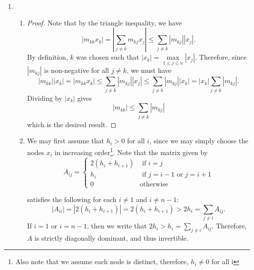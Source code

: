 \documentclass[12pt]{article}
\begin{document}
\begin{enumerate}[leftmargin=2em]
    \item
    \begin{enumerate}
        \item
        \begin{proof}
            Note that by the triangle inequality, we have
            \[|m_{kk}x_k|=\left| \sum_{j\neq k} m_{kj}x_{j}\right|\leq \sum_{j\neq k} |m_{kj}||x_j|.\]
            By definition, $k$ was chosen such that $|x_{k}|= \max\limits_{1\leq j\leq n} |x_j|$. Therefore, since $|m_{kj}|$ is non-negative for all $j\neq k$, we must have
            \[|m_{kk}||x_k|=|m_{kk}x_k|\leq \sum_{j\neq k} |m_{kj}||x_j| \leq \sum_{j\neq k} |m_{kj}||x_k|=|x_k|\sum_{j\neq k} |m_{kj}|.\]
            Dividing by $|x_k|$ gives
            \[|m_{kk}|\leq \sum_{j\neq k} |m_{kj}|\]
            which is the desired result.
        \end{proof}
        \item
        We may first assume that $h_i>0$ for all $i$, since we may simply choose the nodes $x_i$ in increasing order\footnote{Also note that we assume each node is distinct, therefore, $h_{i}\neq 0$ for all i}.
        Note that the matrix given by
        \[A_{ij}=\begin{cases}
            2(h_i+h_{i+1}) & \text{ if } i=j\\
            h_i & \text{ if } j = i-1 \text{ or } j= i+1\\
            0 & \text{otherwise}
        \end{cases}\]

        satisfies the following for each $i\neq 1$ and $i\neq n-1$:
        \[|A_{ii}|=|2(h_{i}+h_{i+1})|=2(h_{i}+h_{i+1})>2h_{i}=\sum_{j\neq i} A_{ij}.\]
        If $i=1$ or $i=n-1$, then we write that $2h_{i}>h_{i}=\sum_{j\neq i} A_{ij}$.
        Therefore, $A$ is strictly diagonally dominant, and thus invertible. 

        \bigskip


\end{enumerate}
\end{enumerate}
\end{document}
